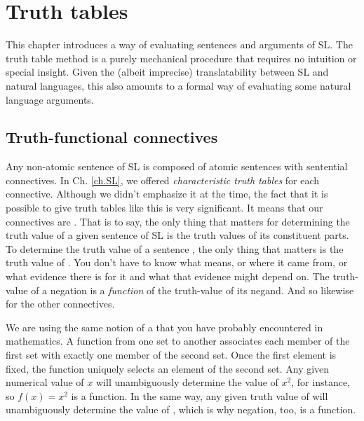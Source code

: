 \chapter{Truth tables}
\label{ch.TruthTables}

This chapter introduces a way of evaluating sentences and arguments of SL. The truth table method is a purely mechanical procedure that requires no intuition or special insight. Given the (albeit imprecise) translatability between SL and natural languages, this also amounts to a formal way of evaluating some natural language arguments.

\section{Truth-functional connectives}

Any non-atomic sentence of SL is composed of atomic sentences with sentential connectives. In Ch. \ref{ch.SL}, we offered \emph{characteristic truth tables} for each connective. Although we didn't emphasize it at the time, the fact that it is possible to give truth tables like this is very significant. It means that our connectives are . That is to say, the only thing that matters for determining the truth value of a given sentence of SL is the truth values of its constituent parts. To determine the truth value of a sentence \enot\metaA{}, the only thing that matters is the truth value of \metaA{}. You don't have to know what \metaA{} means, or where it came from, or what evidence there is for it and what that evidence might depend on. The truth-value of a negation is a \emph{function} of the truth-value of its negand. And so likewise for the other connectives.

We are using the same notion of a  that you have probably encountered in mathematics. A function from one set to another associates each member of the first set with exactly one member of the second set. Once the first element is fixed, the function uniquely selects an element of the second set. Any given numerical value of $x$ will unambiguously determine the value of $x^{2}$, for instance, so $f(x)=x^{2}$ is a function. In the same way, any given truth value of \metaA{} will unambiguously determine the value of \enot\metaA{}, which is why negation, too, is a function.

